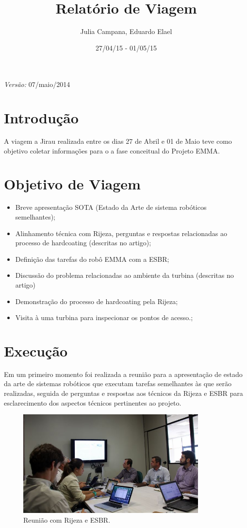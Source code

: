\documentclass{article}
\begin{document}
\title{Relatório de Viagem}
\author{Julia Campana, Eduardo Elael}
\date{27/04/15 - 01/05/15}
\maketitle


\begin{flushright}
  \emph{Versão:} 07/maio/2014
\end{flushright}


\section*{Introdução}
A viagem a Jirau realizada entre os dias 27 de Abril e 01 de Maio teve como
objetivo coletar informações para o a fase conceitual do Projeto EMMA. 

\section*{Objetivo de Viagem}
\begin{itemize}
  \item Breve apresentação SOTA (Estado da Arte de sistema robóticos
  seme\-lhantes);
  \item Alinhamento técnica com Rijeza, perguntas e respostas relacionadas ao
  processo de hardcoating (descritas no artigo);
\item Definição das tarefas do robô EMMA com a ESBR;
\item Discussão do problema relacionadas ao ambiente da turbina (descritas no
artigo) 
\item Demonstração do processo de hardcoating pela Rijeza;
\item Visita à uma turbina para inspecionar os pontos de acesso.;
\end{itemize}


\section*{Execução}
Em um primeiro momento foi realizada a reunião para a apresentação de estado da
arte de sistemas robóticos que executam tarefas semelhantes às que serão
realizadas, seguida de perguntas e respostas aos técnicos da Rijeza e ESBR para
esclarecimento dos aspectos técnicos pertinentes ao projeto.

\begin{figure}[H]
\centering
\includegraphics[width=0.85\textwidth]{Fotos/img_4836.jpg}
\caption{Reunião com Rijeza e ESBR.}
\end{figure}
\end{document}

